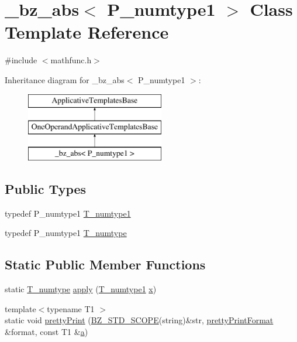 \hypertarget{class__bz__abs}{}\section{\+\_\+bz\+\_\+abs$<$ P\+\_\+numtype1 $>$ Class Template Reference}
\label{class__bz__abs}


{\ttfamily \#include $<$mathfunc.\+h$>$}

Inheritance diagram for \+\_\+bz\+\_\+abs$<$ P\+\_\+numtype1 $>$\+:\begin{figure}[H]
\begin{center}
\leavevmode
\includegraphics[height=3.000000cm]{class__bz__abs}
\end{center}
\end{figure}
\subsection*{Public Types}
\begin{DoxyCompactItemize}
\item 
typedef P\+\_\+numtype1 \hyperlink{class__bz__abs_aa45275dde9d17993815c01c73003c8df}{T\+\_\+numtype1}
\item 
typedef P\+\_\+numtype1 \hyperlink{class__bz__abs_a48b8cc83da99fd32973fd29354afffd7}{T\+\_\+numtype}
\end{DoxyCompactItemize}
\subsection*{Static Public Member Functions}
\begin{DoxyCompactItemize}
\item 
static \hyperlink{class__bz__abs_a48b8cc83da99fd32973fd29354afffd7}{T\+\_\+numtype} \hyperlink{class__bz__abs_ae08174cc05dc3efb42464eef755bfaae}{apply} (\hyperlink{class__bz__abs_aa45275dde9d17993815c01c73003c8df}{T\+\_\+numtype1} \hyperlink{vecnorm1_8cc_ac73eed9e41ec09d58f112f06c2d6cb63}{x})
\item 
{\footnotesize template$<$typename T1 $>$ }\\static void \hyperlink{class__bz__abs_add0569bd70510d6a5f91100fb73bab4f}{pretty\+Print} (\hyperlink{numinquire_8h_a2b24ffc3b4ef9803956bc7715c6c7b83}{B\+Z\+\_\+\+S\+T\+D\+\_\+\+S\+C\+O\+P\+E}(string)\&str, \hyperlink{classprettyPrintFormat}{pretty\+Print\+Format} \&format, const T1 \&\hyperlink{gen__mat5files_8m_aae328bf20413f220e38aec4d95bfd6da}{a})
\end{DoxyCompactItemize}


